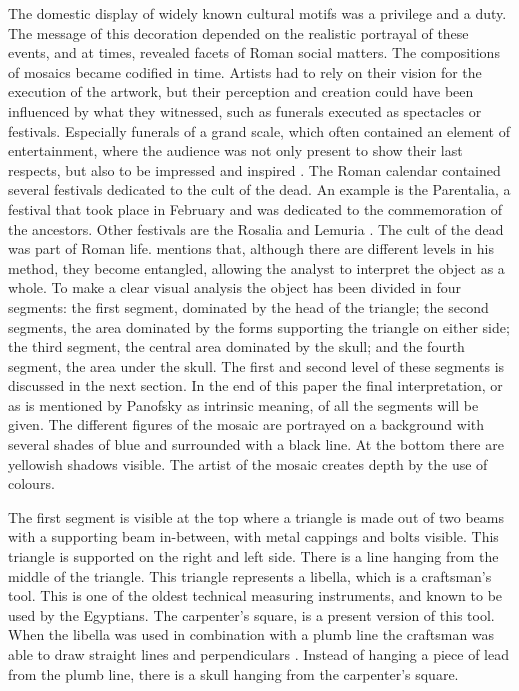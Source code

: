 	The domestic display of widely known cultural motifs was a privilege and a duty. The message of this decoration depended on the realistic portrayal of these events, and at times, revealed facets of Roman social matters. The compositions of mosaics became codified in time. Artists had to rely on their vision for the execution of the artwork, but their perception and creation could have been influenced by what they witnessed, such as funerals executed as spectacles or festivals. Especially funerals of a grand scale, which often contained an element of entertainment, where the audience was not only present to show their last respects, but also to be impressed and inspired  \parencites[112]{Kondoleon_1991}[89]{Hope_2009}. The Roman calendar contained several festivals dedicated to the cult of the dead. An example is the Parentalia, a festival that took place in February and was dedicated to the commemoration of the ancestors. Other festivals are the Rosalia and Lemuria \parencite[123--124]{Erasmo_2012}. The cult of the dead was part of Roman life.	\textcite {Panofsky_1939} mentions that, although there are different levels in his method, they become entangled, allowing the analyst to interpret the object as a whole. To make a clear visual analysis the object has been divided in four segments: the first segment, dominated by the  head of the triangle; the second segments, the area dominated by the forms supporting the triangle on either side; the third segment, the central area dominated by the skull; and the fourth segment, the area under the skull. 
The first and second level of these segments is discussed in the next section. 
In the end of this paper the final interpretation, or as is mentioned by Panofsky as intrinsic meaning, of all the segments will be given. The different figures of the mosaic are portrayed on a background with several shades of blue and surrounded with a black line. 
At the bottom there are yellowish shadows visible. The artist of the mosaic creates depth by the use of colours. 
	
	The first segment is visible at the top where a triangle is made out of two beams with a supporting beam in-between, with metal cappings and bolts visible. This triangle is supported on the right and left side. There is a line hanging from the middle of the triangle. This triangle represents a libella, which is a craftsman’s tool. This is one of the oldest technical measuring instruments, and known to be used by the Egyptians. The carpenter’s square, is a present version of this tool. When the libella was used in combination with a plumb line the craftsman was able to draw straight lines and perpendiculars \parencite [84] {Cuomo_2007}. Instead of hanging a piece of lead from the plumb line, there is a skull hanging from the carpenter’s square. 

